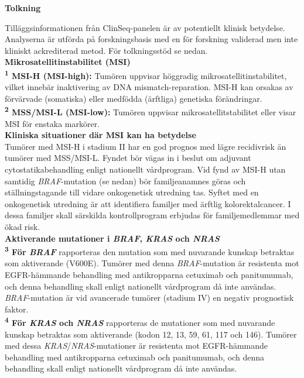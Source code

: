 \documentclass[10pt]{article}
\begin{document}
\vspace{0.3cm}

\textbf{Tolkning} \par
{\small
Tilläggsinformationen från ClinSeq-panelen är av potentiellt klinisk betydelse. Analyserna är utförda på forskningsbasis med en för forskning validerad men inte kliniskt ackrediterad metod. För tolkningsstöd se nedan. \\

\textbf{Mikrosatellitinstabilitet (MSI)}\\
\textbf{\textsuperscript{1} MSI-H (MSI-high):} Tumören uppvisar höggradig mikrosatellitinstabilitet, vilket innebär inaktivering av DNA mismatch-reparation. MSI-H kan orsakas av förvärvade (somatiska) eller medfödda (ärftliga) genetiska förändringar. \\
\textbf{\textsuperscript{2} MSS/MSI-L (MSI-low):} Tumören uppvisar mikrosatellitstabilitet eller visar MSI för enstaka markörer. \\

\textbf{Kliniska situationer där MSI kan ha betydelse}\\
Tumörer med MSI-H i stadium II har en god prognos med lägre recidivrisk än tumörer med MSS/MSI-L. Fyndet bör vägas in i beslut om adjuvant cytostatikabehandling enligt nationellt vårdprogram. Vid fynd av MSI-H utan samtidig \textit{BRAF}-mutation (se nedan) bör familjeanamnes göras och ställningstagande till vidare onkogenetisk utredning tas. Syftet med en onkogenetisk utredning är att identifiera familjer med ärftlig kolorektalcancer. I dessa familjer skall särskilda kontrollprogram erbjudas för familjemedlemmar med ökad risk. \\

\textbf{Aktiverande mutationer i \textit{BRAF}, \textit{KRAS} och \textit{NRAS}}\\
\textbf{\textsuperscript{3} För \textit{BRAF}} rapporteras den mutation som med nuvarande kunskap betraktas som aktiverande (V600E). Tumörer med denna \textit{BRAF}-mutation är resistenta mot EGFR-hämmande behandling med antikropparna cetuximab och panitumumab, och denna behandling skall enligt nationellt vårdprogram då inte användas. \textit{BRAF}-mutation är vid avancerade tumörer (stadium IV) en negativ prognostisk faktor. \\
\textbf{\textsuperscript{4} För \textit{KRAS} och \textit{NRAS}} rapporteras de mutationer som med nuvarande kunskap betraktas som aktiverande (kodon 12, 13, 59, 61, 117 och 146). Tumörer med dessa \textit{KRAS}/\textit{NRAS}-mutationer är resistenta mot EGFR-hämmande behandling med antikropparna cetuximab och panitumumab, och denna behandling skall enligt nationellt vårdprogram då inte användas. \\
}
\par
\end{document}
